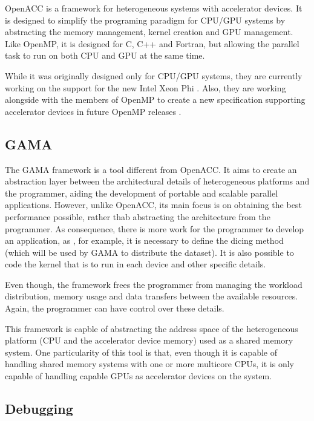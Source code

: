 OpenACC \cite{OpenACC} is a framework for heterogeneous systems with accelerator devices. It is designed to simplify the programing paradigm for CPU/GPU systems by abstracting the memory management, kernel creation and GPU management. Like OpenMP, it is designed for C, C++ and Fortran, but allowing the parallel task to run on both CPU and GPU at the same time.

While it was originally designed only for CPU/GPU systems, they are currently working on the support for the new Intel Xeon Phi \cite{OpenACC:HPCWire}. Also, they are working alongside with the members of OpenMP to create a new specification supporting accelerator devices in future OpenMP releases \cite{OpenACC:OpenMP}.

\subsection{GAMA}

The GAMA framework \cite{GAMA} is a tool different from OpenACC. It aims to create an abstraction layer between the architectural details of heterogeneous platforms and the programmer, aiding the development of portable and scalable parallel applications. However, unlike OpenACC, its main focus is on obtaining the best performance possible, rather thab abstracting the architecture from the programmer. As consequence, there is more work for the programmer to develop an application, as , for example, it is necessary to define the dicing method (which will be used by GAMA to distribute the dataset). It is also possible to code the kernel that is to run in each device and other specific details.

Even though, the framework frees the programmer from managing the workload distribution, memory usage and data transfers between the available resources. Again, the programmer can have control over these details.

This framework is capble of abstracting the address space of the heterogeneous platform (CPU and the accelerator device memory) used as a shared memory system. One particularity of this tool is that, even though it is capable of handling shared memory systems with one or more multicore CPUs, it is only capable of handling \cuda capable GPUs as accelerator devices on the system.

\subsection{Debugging}

